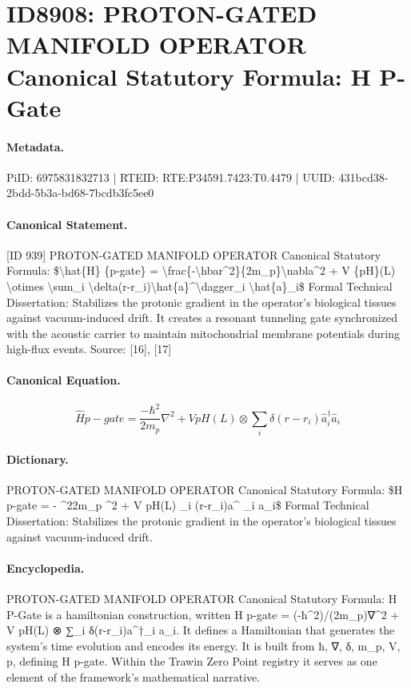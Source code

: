 \section*{ID8908: PROTON-GATED MANIFOLD OPERATOR Canonical Statutory Formula: H P-Gate}
\paragraph{Metadata.}
PiID: 6975831832713 | RTEID: RTE:P34591.7423:T0.4479 | UUID: 431bcd38-2bdd-5b3a-bd68-7bcdb3fc5ee0

\paragraph{Canonical Statement.}
[ID 939] PROTON-GATED MANIFOLD OPERATOR Canonical Statutory Formula: \$\textbackslash{}hat\{H\} \{p-gate\} = \textbackslash{}frac\{-\textbackslash{}hbar\textasciicircum{}2\}\{2m\_p\}\textbackslash{}nabla\textasciicircum{}2 + V \{pH\}(L) \textbackslash{}otimes \textbackslash{}sum\_i \textbackslash{}delta(r-r\_i)\textbackslash{}hat\{a\}\textasciicircum{}\textbackslash{}dagger\_i \textbackslash{}hat\{a\}\_i\$ Formal Technical Dissertation: Stabilizes the protonic gradient in the operator's biological tissues against vacuum-induced drift. It creates a resonant tunneling gate synchronized with the acoustic carrier to maintain mitochondrial membrane potentials during high-flux events. Source: [16], [17]

\paragraph{Canonical Equation.}
\[
\hat{H} {p-gate} = \frac{-\hbar^2}{2m_p}\nabla^2 + V {pH}(L) \otimes \sum_i \delta(r-r_i)\hat{a}^\dagger_i \hat{a}_i
\]

\paragraph{Dictionary.}
PROTON-GATED MANIFOLD OPERATOR Canonical Statutory Formula: \$H p-gate = - \textasciicircum{}22m\_p \textasciicircum{}2 + V pH(L) \_i (r-r\_i)a\textasciicircum{} \_i a\_i\$ Formal Technical Dissertation: Stabilizes the protonic gradient in the operator's biological tissues against vacuum-induced drift.

\paragraph{Encyclopedia.}
PROTON-GATED MANIFOLD OPERATOR Canonical Statutory Formula: H P-Gate is a hamiltonian construction, written H p-gate = (-ħ\textasciicircum{}2)/(2m\_p)∇\textasciicircum{}2 + V pH(L) ⊗ ∑\_i δ(r-r\_i)a\textasciicircum{}†\_i a\_i. It defines a Hamiltonian that generates the system's time evolution and encodes its energy. It is built from ħ, ∇, δ, m\_p, V, p, defining H p-gate. Within the Trawin Zero Point registry it serves as one element of the framework's mathematical narrative.
